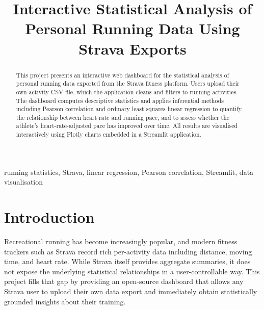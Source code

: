 \documentclass[conference]{IEEEtran}
\begin{document}
\title{Interactive Statistical Analysis of Personal Running Data Using Strava Exports}

\author{
\and
{}
}

\maketitle

\begin{abstract}
This project presents an interactive web dashboard for the statistical analysis of personal running data exported from the Strava fitness platform. Users upload their own activity CSV file, which the application cleans and filters to running activities. The dashboard computes descriptive statistics and applies inferential methods including Pearson correlation and ordinary least squares linear regression to quantify the relationship between heart rate and running pace, and to assess whether the athlete's heart-rate-adjusted pace has improved over time. All results are visualised interactively using Plotly charts embedded in a Streamlit application.
\end{abstract}

\begin{IEEEkeywords}
running statistics, Strava, linear regression, Pearson correlation, Streamlit, data visualisation
\end{IEEEkeywords}

\section{Introduction}

Recreational running has become increasingly popular, and modern fitness trackers such as Strava record rich per-activity data including distance, moving time, and heart rate. While Strava itself provides aggregate summaries, it does not expose the underlying statistical relationships in a user-controllable way. This project fills that gap by providing an open-source dashboard that allows any Strava user to upload their own data export and immediately obtain statistically grounded insights about their training.
\end{document}
